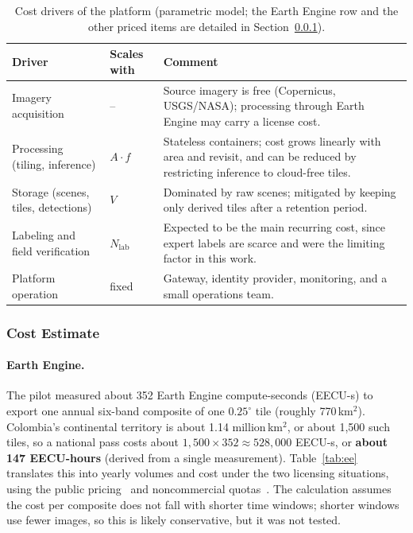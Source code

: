 \documentclass{article}
\begin{document}
\begin{table}[H]
\centering
\caption{Cost drivers of the platform (parametric model; the Earth Engine row and
the other priced items are detailed in Section~\ref{sec:cost-estimate}).}
\label{tab:costs}
\begin{tabularx}{\linewidth}{l l X}
\toprule
\textbf{Driver} & \textbf{Scales with} & \textbf{Comment} \\
\midrule
Imagery acquisition & -- & Source imagery is free (Copernicus, USGS/NASA); processing through Earth Engine may carry a license cost. \\
Processing (tiling, inference) & $A \cdot f$ & Stateless containers; cost grows linearly with area and revisit, and can be reduced by restricting inference to cloud-free tiles. \\
Storage (scenes, tiles, detections) & $V$ & Dominated by raw scenes; mitigated by keeping only derived tiles after a retention period. \\
Labeling and field verification & $N_{\text{lab}}$ & Expected to be the main recurring cost, since expert labels are scarce and were the limiting factor in this work. \\
Platform operation & fixed & Gateway, identity provider, monitoring, and a small operations team. \\
\bottomrule
\end{tabularx}
\end{table}

\subsubsection{Cost Estimate}
\label{sec:cost-estimate}

\paragraph{Earth Engine.}
The pilot measured about 352 Earth Engine compute-seconds (EECU-s) to export one
annual six-band composite of one $0.25^\circ$ tile (roughly 770\,km$^2$).
Colombia's continental territory is about 1.14 million\,km$^2$, or about 1{,}500
such tiles, so a national pass costs about $1{,}500\times352 \approx 528{,}000$
EECU-s, or \textbf{about 147 EECU-hours} (derived from a single measurement).
Table~\ref{tab:ee} translates this into yearly volumes and cost under the two
licensing situations, using the public pricing~\cite{ee_pricing} and
noncommercial quotas~\cite{ee_noncommercial}. The calculation assumes the cost
per composite does not fall with shorter time windows; shorter windows use fewer
images, so this is likely conservative, but it was not tested.
\end{document}
